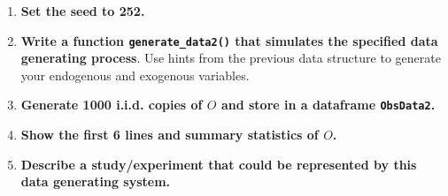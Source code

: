 \documentclass[answers]{exam}
\begin{document}
\begin{enumerate}
\item \textbf{Set the seed to 252.}
\item \textbf{Write a function \texttt{generate\_data2()} that simulates the specified data generating process}. Use hints from the previous data structure to generate your endogenous and exogenous variables. 
\item \textbf{Generate 1000 i.i.d. copies of $O$ and store in a dataframe \texttt{ObsData2}.}
\item \textbf{Show the first 6 lines and summary statistics of $O$.}
\item \textbf{Describe a study/experiment that could be represented by this data generating system.}
\end{enumerate}
\end{document}
